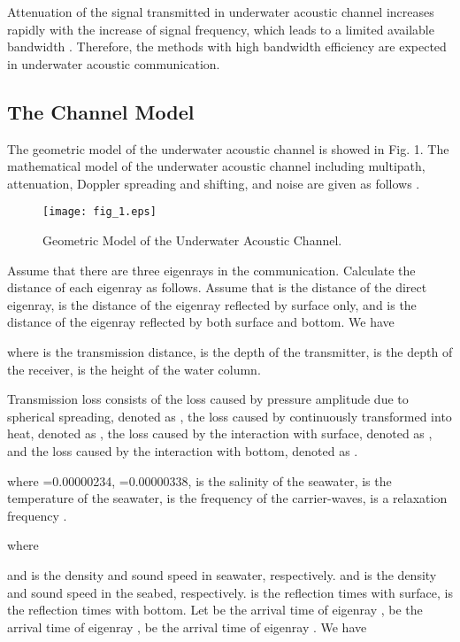 \documentclass[journal]{IEEEtran}
\begin{document}
Attenuation of the signal transmitted in underwater acoustic channel
increases rapidly with the increase of signal frequency, which leads
to a limited available bandwidth \cite{Stojanovic2009}. Therefore,
the methods with high bandwidth efficiency are expected in
underwater acoustic communication.
\subsection{The Channel Model}
The geometric model of the underwater acoustic channel is showed in
Fig. 1. The mathematical model of the underwater acoustic channel
including multipath, attenuation, Doppler spreading and shifting,
and noise are given as follows \cite{Chitre2007}.
\begin{figure}[!t]
\centering
\texttt{[image: fig\_1.eps]}
\caption{Geometric Model of the Underwater Acoustic Channel.}
\label{fig_sim}
\end{figure}

Assume that there are three eigenrays in the communication.
Calculate the distance of each eigenray as follows. Assume that
 is the distance of the direct eigenray,  is the
distance of the eigenray reflected by surface only, and  is
the distance of the eigenray reflected by both surface and bottom.
We have



where  is the transmission distance,  is the depth of the
transmitter,  is the depth of the receiver,  is the height
of the water column.

Transmission loss consists of the loss caused by pressure amplitude
due to spherical spreading, denoted as , the loss caused
by continuously transformed into heat, denoted as , the loss
caused by the interaction with surface, denoted as , and the
loss caused by the interaction with bottom, denoted as .


where =0.00000234, =0.00000338,  is the salinity of the
seawater,  is the temperature of the seawater,  is the
frequency of the carrier-waves,  is a relaxation frequency
\cite{Brekhovskikh2002}.



where


 and  is the density and sound speed in seawater,
respectively.  and  is the density and sound speed
in the seabed, respectively.  is the reflection times with
surface,  is the reflection times with bottom. Let  be
the arrival time of eigenray ,  be the arrival time
of eigenray ,  be the arrival time of eigenray
. We have
\end{document}

